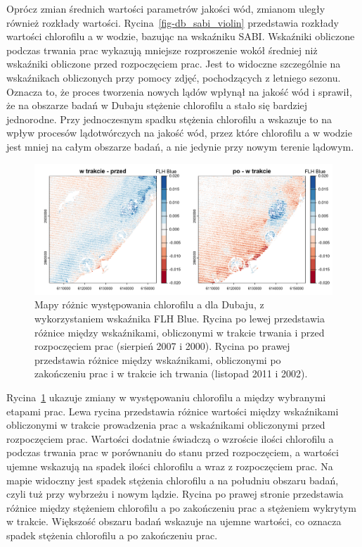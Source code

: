 \documentclass{amuthesis}
\begin{document}
Oprócz zmian średnich wartości parametrów jakości wód, zmianom uległy
również rozkłady wartości. Rycina~\ref{fig-db_sabi_violin} przedstawia
rozkłady wartości chlorofilu a w wodzie, bazując na wskaźniku SABI.
Wskaźniki obliczone podczas trwania prac wykazują mniejsze rozproszenie
wokół średniej niż wskaźniki obliczone przed rozpoczęciem prac. Jest to
widoczne szczególnie na wskaźnikach obliczonych przy pomocy zdjęć,
pochodzących z letniego sezonu. Oznacza to, że proces tworzenia nowych
lądów wpłynął na jakość wód i sprawił, że na obszarze badań w Dubaju
stężenie chlorofilu a stało się bardziej jednorodne. Przy jednoczesnym
spadku stężenia chlorofilu a wskazuje to na wpływ procesów lądotwórczych
na jakość wód, przez które chlorofilu a w wodzie jest mniej na całym
obszarze badań, a nie jedynie przy nowym terenie lądowym.

\begin{figure}[t]

{\centering \includegraphics[width=6.25in,height=\textheight]{figures/dubai/flhblue_diff.png}

}

\caption{\label{fig-db_flhblue_diff}Mapy różnic występowania chlorofilu
a dla Dubaju, z wykorzystaniem wskaźnika FLH Blue. Rycina po lewej
przedstawia różnice między wskaźnikami, obliczonymi w trakcie trwania i
przed rozpoczęciem prac (sierpień 2007 i 2000). Rycina po prawej
przedstawia różnice między wskaźnikami, obliczonymi po zakończeniu prac
i w trakcie ich trwania (listopad 2011 i 2002).}

\end{figure}

Rycina~\ref{fig-db_flhblue_diff} ukazuje zmiany w występowaniu
chlorofilu a między wybranymi etapami prac. Lewa rycina przedstawia
różnice wartości między wskaźnikami obliczonymi w trakcie prowadzenia
prac a wskaźnikami obliczonymi przed rozpoczęciem prac. Wartości
dodatnie świadczą o wzroście ilości chlorofilu a podczas trwania prac w
porównaniu do stanu przed rozpoczęciem, a wartości ujemne wskazują na
spadek ilości chlorofilu a wraz z rozpoczęciem prac. Na mapie widoczny
jest spadek stężenia chlorofilu a na południu obszaru badań, czyli tuż
przy wybrzeżu i nowym lądzie. Rycina po prawej stronie przedstawia
różnice między stężeniem chlorofilu a po zakończeniu prac a stężeniem
wykrytym w trakcie. Większość obszaru badań wskazuje na ujemne wartości,
co oznacza spadek stężenia chlorofilu a po zakończeniu prac.
\end{document}
